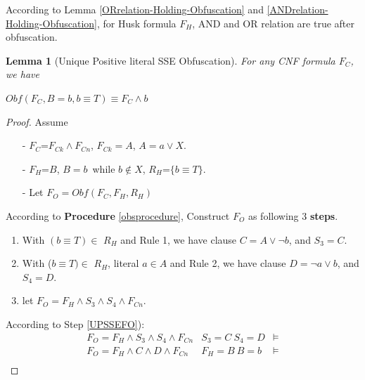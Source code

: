 \documentclass[conference]{IEEEtran}
\newtheorem{lemma}{\textbf{Lemma}}
\begin{document}
According to Lemma \ref{ORrelation-Holding-Obfuscation} and \ref{ANDrelation-Holding-Obfuscation},
for Husk formula $F_H$,  AND and OR relation are true after obfuscation.

\begin{lemma}[Unique Positive literal SSE Obfuscation]\label{UPSSE-lemma}
For any CNF formula $F_C$, we have

\textbf{$Obf(F_C,B=b,{b\equiv T})\equiv F_C\wedge b$}
\end{lemma}
\begin{proof}
Assume
\begin{enumerate}
 \item[-]$F_C$=$F_{Ck} \wedge F_{Cn}$, $F_{Ck}=A$, $A=a\vee X$.  
 \item[-]$F_H$=$B$, $B=b$~while $b\notin X$, $R_H$=$\{b\equiv T\}$.
 \item[-]Let $F_O=Obf(F_C,F_H,R_H)$
 \end{enumerate}
According to \textbf{Procedure} \ref{obsprocedure}, Construct $F_O$ as following 3 \textbf{steps}.
\begin{enumerate}
\item With $(b\equiv T) \in $ $R_H$ and Rule 1, 
we have clause $C=A\vee \neg b$, and $S_3=C$.
\item
With ($b\equiv T) \in $ $R_H$, literal $a\in A$ and Rule 2, 
we have clause $D=\neg a\vee b$,
and $S_4=D$.
\item \label{UPSSEFO}
let $F_O=F_H \wedge S_3\wedge S_4 \wedge F_{Cn}$.
\end{enumerate}
According to Step \ref{UPSSEFO}):
\begin{equation}
\begin{array}{ccc}
F_O  =  F_H \wedge S_3\wedge S_4\wedge F_{Cn}           &S_3=C~ S_4=D              &\models\\
F_O  =  F_H\wedge C\wedge D\wedge F_{Cn}                &F_H=B~ B=b                &\models\\

\end{array}
\end{equation}
\end{proof}
\end{document}
